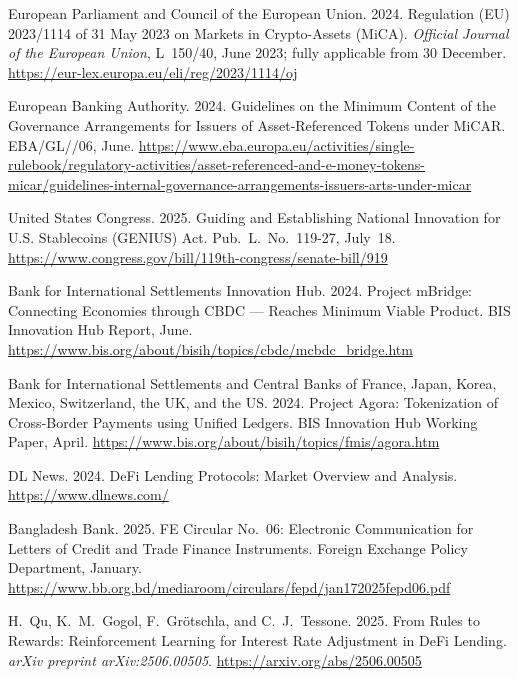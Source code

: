 \documentclass[12pt,a4paper]{report}
\begin{document}
{\begin{enumerate}[label={[\arabic*]}]
\item European Parliament and Council of the European Union. 2024. Regulation (EU) 2023/1114 of 31 May 2023 on Markets in Crypto-Assets (MiCA). \emph{Official Journal of the European Union}, L~150/40, June 2023; fully applicable from 30 December. \url{https://eur-lex.europa.eu/eli/reg/2023/1114/oj}

\item European Banking Authority. 2024. Guidelines on the Minimum Content of the Governance Arrangements for Issuers of Asset-Referenced Tokens under MiCAR. EBA/GL//06, June. \url{https://www.eba.europa.eu/activities/single-rulebook/regulatory-activities/asset-referenced-and-e-money-tokens-micar/guidelines-internal-governance-arrangements-issuers-arts-under-micar}

\item United States Congress. 2025. Guiding and Establishing National Innovation for U.S. Stablecoins (GENIUS) Act. Pub.~L.~No.~119-27, July~18. \url{https://www.congress.gov/bill/119th-congress/senate-bill/919}

\item Bank for International Settlements Innovation Hub. 2024. Project mBridge: Connecting Economies through CBDC --- Reaches Minimum Viable Product. BIS Innovation Hub Report, June. \url{https://www.bis.org/about/bisih/topics/cbdc/mcbdc_bridge.htm}

\item Bank for International Settlements and Central Banks of France, Japan, Korea, Mexico, Switzerland, the UK, and the US. 2024. Project Agora: Tokenization of Cross-Border Payments using Unified Ledgers. BIS Innovation Hub Working Paper, April. \url{https://www.bis.org/about/bisih/topics/fmis/agora.htm}

\item DL News. 2024. DeFi Lending Protocols: Market Overview and Analysis. \url{https://www.dlnews.com/}

\item Bangladesh Bank. 2025. FE Circular No.~06: Electronic Communication for Letters of Credit and Trade Finance Instruments. Foreign Exchange Policy Department, January. \url{https://www.bb.org.bd/mediaroom/circulars/fepd/jan172025fepd06.pdf}

\item H.~Qu, K.~M.~Gogol, F.~Gr\"{o}tschla, and C.~J.~Tessone. 2025. From Rules to Rewards: Reinforcement Learning for Interest Rate Adjustment in DeFi Lending. \emph{arXiv preprint arXiv:2506.00505}. \url{https://arxiv.org/abs/2506.00505}


\end{enumerate}}
\end{document}
